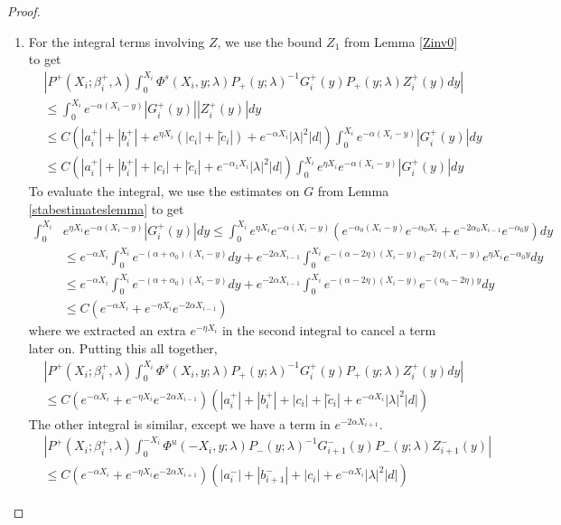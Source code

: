 \documentclass[thesis.tex]{subfiles}
\begin{document}
\begin{lemma}
\begin{proof}
\begin{enumerate}
\item For the integral terms involving $Z$, we use the bound $Z_1$ from Lemma \ref{Zinv0} to get
\begin{align*}
&\left|
P^+(X_i; \beta_i^+, \lambda) \int_0^{X_i} \Phi^s(X_i, y; \lambda) P_+(y; \lambda)^{-1} G_i^+(y) P_+(y; \lambda) Z_i^+(y) dy \right| \\
&\leq \int_0^{X_i} e^{-\alpha(X_i - y)} |G_i^+(y)| |Z_i^+(y)| dy \\
&\leq C \left(|a_i^+| + |b_i^+| + e^{\eta X_i}(|c_i| + |\tilde{c}_i|) + e^{-\alpha X_i}|\lambda|^2|d| \right) \int_0^{X_i} e^{-\alpha(X_i - y)} |G_i^+(y)| dy \\
&\leq C \left(|a_i^+| + |b_i^+| + |c_i| + |\tilde{c}_i| + e^{-\alpha_1 X_i}|\lambda|^2|d| \right) \int_0^{X_i}  e^{\eta X_i} e^{-\alpha(X_i - y)} |G_i^+(y)| dy
\end{align*}
To evaluate the integral, we use the estimates on $G$ from Lemma \ref{stabestimateslemma} to get
\begin{align*}
\int_0^{X_i} &e^{\eta X_i} e^{-\alpha(X_i - y)} |G_i^+(y)| dy \leq \int_0^{X_i} e^{\eta X_i} e^{-\alpha(X_i - y)} \left(e^{-\alpha_0(X_i - y)}e^{-\alpha_0 X_i} + e^{-2 \alpha_0 X_{i-1}} e^{-\alpha_0 y} \right) dy \\
&\leq e^{-\alpha X_i} \int_0^{X_i} e^{-(\alpha + \alpha_0)(X_i - y)} dy + e^{-2 \alpha X_{i-1}} \int_0^{X_i} e^{-(\alpha - 2 \eta)(X_i - y)}e^{-2 \eta(X_i - y)}e^{\eta X_i}e^{-\alpha_0 y} dy \\
&\leq e^{-\alpha X_i} \int_0^{X_i} e^{-(\alpha + \alpha_0)(X_i - y)} dy + e^{-2 \alpha X_{i-1}} \int_0^{X_i} e^{-(\alpha - 2\eta)(X_i - y)}e^{-(\alpha_0 - 2 \eta)y} dy \\
&\leq C (e^{-\alpha X_i} + e^{-\eta X_i} e^{-2 \alpha X_{i-1}})
\end{align*}
where we extracted an extra $e^{-\eta X_i}$ in the second integral to cancel a term later on. Putting this all together,
\begin{align*}
&\left|
P^+(X_i; \beta_i^+, \lambda) \int_0^{X_i} \Phi^s(X_i, y; \lambda) P_+(y; \lambda)^{-1} G_i^+(y) P_+(y; \lambda) Z_i^+(y) dy \right| \\
&\leq C (e^{-\alpha X_i} + e^{-\eta X_i} e^{-2 \alpha X_{i-1}}) \left(|a_i^+| + |b_i^+| + |c_i| + |\tilde{c}_i| + e^{-\alpha X_i}|\lambda|^2|d| \right)
\end{align*}
The other integral is similar, except we have a term in $e^{-2 \alpha X_{i+1}}$.
\begin{align*}
&\left|
P^+(X_i; \beta_i^+, \lambda) \int_0^{-X_i} \Phi^u(-X_i, y; \lambda) P_-(y; \lambda)^{-1} G_{i+1}^-(y) P_-(y; \lambda)Z_{i+1}^-(y) \right| \\
&\leq C (e^{-\alpha X_i} + e^{-\eta X_i} e^{-2 \alpha X_{i+1}}) \left(|a_i^-| + |b_{i+1}^-| + |c_i| + e^{-\alpha X_i}|\lambda|^2|d| \right)
\end{align*}


\end{enumerate}
\end{proof}
\end{lemma}
\end{document}
